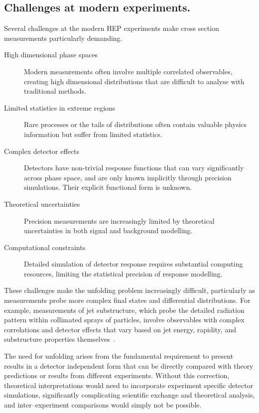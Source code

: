 \begin{definition}
\section{Challenges at modern experiments.}
    Several challenges at the modern HEP experiments make cross section measurements particularly demanding.

    \begin{description}
        \item [High dimensional phase spaces] Modern measurements often involve multiple correlated observables, creating high dimensional distributions that are difficult to analyse with traditional methods.
        \item [Limited statistics in extreme regions] Rare processes or the tails of distributions often contain valuable physics information but suffer from limited statistics.
        \item [Complex detector effects] Detectors have non-trivial response functions that can vary significantly across phase space, and are only known implicitly through precision simulations. Their explicit functional form is unknown.
        \item [Theoretical uncertainties] Precision measurements are increasingly limited by theoretical uncertainties in both signal and background modelling.
        \item [Computational constraints] Detailed simulation of detector response requires substantial computing resources, limiting the statistical precision of response modelling.
    \end{description}

    These challenges make the unfolding problem increasingly difficult, particularly as measurements probe more complex final states and differential distributions.
    For example, measurements of jet substructure, which probe the detailed radiation pattern within collimated sprays of particles, involve observables with complex correlations and detector effects that vary based on jet energy, rapidity, and substructure properties themselves~\cite{Larkoski2020JetLearning, kogler_jet_2019, mozer_jet_2017}.
    
    The need for unfolding arises from the fundamental requirement to present results in a detector independent form that can be directly compared with theory predictions or results from different experiments.
    Without this correction, theoretical interpretations would need to incorporate experiment specific detector simulations, significantly complicating scientific exchange and theoretical analysis, and inter--experiment comparisons would simply not be possible.


\end{definition}
